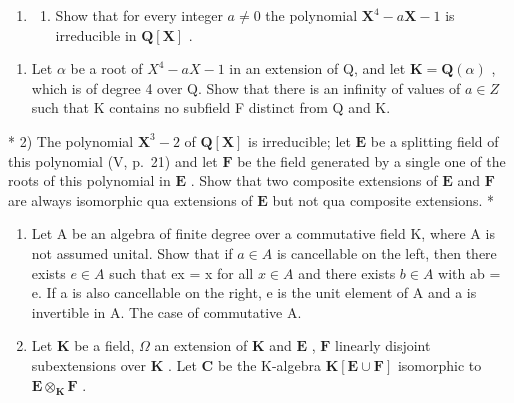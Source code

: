 \BourbakiExerciseGroup

\begin{enumerate}
\def\labelenumi{\arabic{enumi})}
\tightlist
\item
  \begin{enumerate}
  \def\labelenumii{\alph{enumii})}
  \tightlist
  \item
    Show that for every integer \(a \neq 0\) the polynomial \(\mathbf{X}^4 - a\mathbf{X} - 1\) is irreducible in \(\mathbf{Q}[\mathbf{X}]\) .
  \end{enumerate}
\end{enumerate}

\begin{enumerate}
\def\labelenumi{\alph{enumi})}
\setcounter{enumi}{1}
\tightlist
\item
  Let \(\alpha\) be a root of \(X^{4}-aX-1\) in an extension of Q, and let \(\mathbf{K}=\mathbf{Q}(\alpha)\) , which is of degree 4 over Q. Show that there is an infinity of values of \(a\in Z\) such that K contains no subfield F distinct from Q and K.
\end{enumerate}

* 2) The polynomial \(\mathbf{X}^3 - 2\) of \(\mathbf{Q}[\mathbf{X}]\) is irreducible; let \(\mathbf{E}\) be a splitting field of this polynomial (V, p.~21) and let \(\mathbf{F}\) be the field generated by a single one of the roots of this polynomial in \(\mathbf{E}\) . Show that two composite extensions of \(\mathbf{E}\) and \(\mathbf{F}\) are always isomorphic qua extensions of \(\mathbf{E}\) but not qua composite extensions. *

\begin{enumerate}
\def\labelenumi{\arabic{enumi})}
\setcounter{enumi}{2}
\item
  Let A be an algebra of finite degree over a commutative field K, where A is not assumed unital. Show that if \(a \in A\) is cancellable on the left, then there exists \(e \in A\) such that ex = x for all \(x \in A\) and there exists \(b \in A\) with ab = e. If a is also cancellable on the right, e is the unit element of A and a is invertible in A. The case of commutative A.
\item
  Let \(\mathbf{K}\) be a field, \(\Omega\) an extension of \(\mathbf{K}\) and \(\mathbf{E}\) , \(\mathbf{F}\) linearly disjoint subextensions over \(\mathbf{K}\) . Let \(\mathbf{C}\) be the K-algebra \(\mathbf{K}[\mathbf{E} \cup \mathbf{F}]\) isomorphic to \(\mathbf{E} \otimes_{\mathbf{K}} \mathbf{F}\) .
\end{enumerate}

